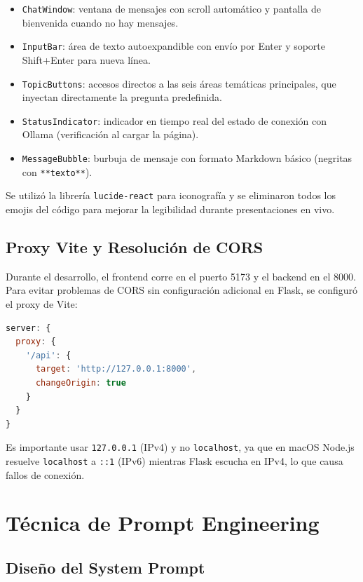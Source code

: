 \documentclass{IEEEtran}
\begin{document}
\begin{itemize}
  \item \texttt{ChatWindow}: ventana de mensajes con scroll automático y
    pantalla de bienvenida cuando no hay mensajes.
  \item \texttt{InputBar}: área de texto autoexpandible con envío por
    Enter y soporte Shift+Enter para nueva línea.
  \item \texttt{TopicButtons}: accesos directos a las seis áreas temáticas
    principales, que inyectan directamente la pregunta predefinida.
  \item \texttt{StatusIndicator}: indicador en tiempo real del estado de
    conexión con Ollama (verificación al cargar la página).
  \item \texttt{MessageBubble}: burbuja de mensaje con formato Markdown
    básico (negritas con \texttt{**texto**}).
\end{itemize}

Se utilizó la librería \texttt{lucide-react} para iconografía y se
eliminaron todos los emojis del código para mejorar la legibilidad
durante presentaciones en vivo.

\subsection{Proxy Vite y Resolución de CORS}

Durante el desarrollo, el frontend corre en el puerto 5173 y el backend
en el 8000. Para evitar problemas de CORS sin configuración adicional
en Flask, se configuró el proxy de Vite:

\begin{lstlisting}[language=JavaScript]
server: {
  proxy: {
    '/api': {
      target: 'http://127.0.0.1:8000',
      changeOrigin: true
    }
  }
}
\end{lstlisting}

\noindent
Es importante usar \texttt{127.0.0.1} (IPv4) y no \texttt{localhost},
ya que en macOS Node.js resuelve \texttt{localhost} a \texttt{::1} (IPv6)
mientras Flask escucha en IPv4, lo que causa fallos de conexión.

\section{Técnica de Prompt Engineering}

\subsection{Diseño del System Prompt}
\end{document}
